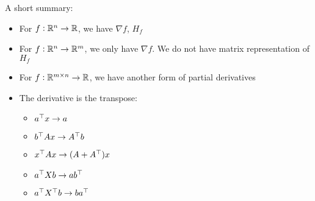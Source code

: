 A short summary:
\begin{itemize}
    \item For $f:\mathbb{R}^n \rightarrow \mathbb{R}$, we have $\nabla f$, $H_f$
    \item For $f:\mathbb{R}^n \rightarrow \mathbb{R}^m$, we only have $\nabla f$. We do not have matrix representation of $H_f$
    \item For $f: \mathbb{R}^{m \times n} \rightarrow \mathbb{R}$, we have another form of partial derivatives
    \item The derivative is the transpose:
        \begin{itemize}
            \item ${a}^\top x \rightarrow a$
            \item ${b}^\top A x \rightarrow {A}^\top b$
            \item ${x}^\top A x \rightarrow (A + {A}^\top) x$
            \item ${a}^\top X b \rightarrow a {b}^\top$
            \item ${a}^\top {X}^\top b \rightarrow b {a}^\top$    
        \end{itemize}

\end{itemize}































